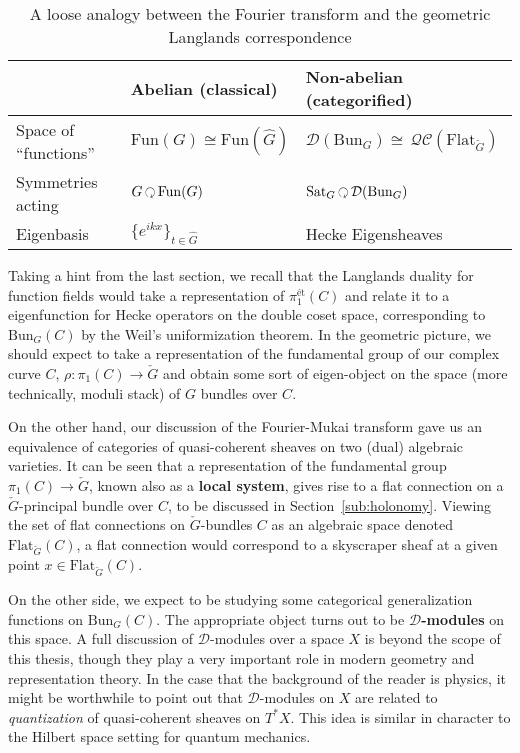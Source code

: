  
\begin{table}[h!]
	\centering
\begin{tabularx}{\textwidth}{|>{\hsize}Y|Y|>{\hsize}Y|}
	\hline
	& Abelian (classical) & Non-abelian (categorified)\\
	\hline
	Space of ``functions'' & $\mathrm{Fun}(G) \cong \mathrm{Fun}(\hat G)$ & $\mathcal D (\mathrm{Bun}_G) \cong \, \mathcal{QC}(\mathrm{Flat}_{\check G})$\\
	Symmetries acting & $G \lacts \mathrm{Fun}(G)$ & $\mathrm{Sat}_G \lacts \mathcal D (\mathrm{Bun}_G)$\\
	Eigenbasis & $\{e^{ikx}\}_{t \in \hat G}$ & Hecke Eigensheaves\\
	\hline
	\end{tabularx}
\caption{A loose analogy between the Fourier transform and the geometric Langlands correspondence}
\label{tab:geometric_langlands}
\end{table}


Taking a hint from the last section, we recall that the Langlands duality for function fields would take a representation of $\pi_1^{\text{\'et}}(C)$ and relate it to a eigenfunction for Hecke operators on the double coset space, corresponding to $\mathrm{Bun}_G(C)$ by the Weil's uniformization theorem. 
In the geometric picture, we should expect to take a representation of the fundamental group of our complex curve $C$, $\rho: \pi_1(C) \to \check G$ and obtain some sort of eigen-object on the space (more technically, moduli stack) of $G$ bundles over $C$. 

On the other hand, our discussion of the Fourier-Mukai transform gave us an equivalence of categories of quasi-coherent sheaves on two (dual) algebraic varieties. It can be seen that a representation of the fundamental group $\pi_1 (C) \to \check G$, known also as a \textbf{local system}, gives rise to a flat connection on a $\check G$-principal bundle over $C$, to be discussed in Section~\ref{sub:holonomy}. Viewing the set of flat connections on $\check G$-bundles $C$ as an algebraic space denoted $\mathrm{Flat}_{\check G} (C)$, a flat connection would correspond to a skyscraper sheaf at a given point $x \in \mathrm{Flat}_{\check G} (C)$. 

On the other side, we expect to be studying some categorical generalization functions on $\mathrm{Bun}_G(C)$. The appropriate object turns out to be \textbf{$\mathcal D$-modules} on this space.
A full discussion of $\mathcal D$-modules over a space $X$ is beyond the scope of this thesis, though they play a very important role in modern geometry and representation theory. In the case that the background of the reader is physics, it might be worthwhile to point out that $\mathcal D$-modules on $X$ are related to \emph{quantization} of quasi-coherent sheaves on $T^* X$. This idea is similar in character to the Hilbert space setting for quantum mechanics.

